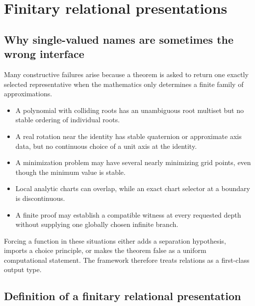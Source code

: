 \section{Finitary relational presentations}
\label{sec:relational}

\subsection{Why single-valued names are sometimes the wrong interface}

Many constructive failures arise because a theorem is asked to return one
exactly selected representative when the mathematics only determines a finite
family of approximations.

\begin{itemize}
\item A polynomial with colliding roots has an unambiguous root multiset but no
      stable ordering of individual roots.
\item A real rotation near the identity has stable quaternion or approximate
      axis data, but no continuous choice of a unit axis at the identity.
\item A minimization problem may have several nearly minimizing grid points,
      even though the minimum value is stable.
\item Local analytic charts can overlap, while an exact chart selector at a
      boundary is discontinuous.
\item A finite proof may establish a compatible witness at every requested
      depth without supplying one globally chosen infinite branch.
\end{itemize}

Forcing a function in these situations either adds a separation hypothesis,
imports a choice principle, or makes the theorem false as a uniform
computational statement.  The framework therefore treats relations as a
first-class output type.

\subsection{Definition of a finitary relational presentation}

